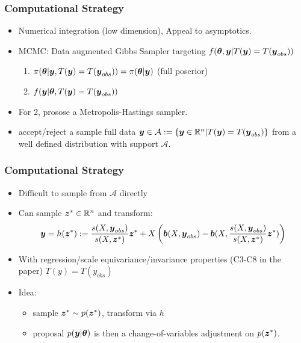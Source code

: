 \documentclass{beamer}
\def\bth{\mbox{\boldmath $\theta$}}
\newcommand{\by}{\mbox{\boldmath $y$}}
\newcommand{\bz}{\mbox{\boldmath $z$}}
\newcommand{\bb}{\mbox{\boldmath $b$}}
\begin{document}
\begin{frame}
\frametitle{Computational Strategy}
\begin{itemize}
	\item Numerical integration (low dimension), Appeal to asymptotics.
	\item MCMC: Data augmented Gibbs Sampler targeting $f(\bth, \by | T(\by)=T(\by_{obs}))$
	\begin{enumerate}
		\item $\pi(\bth|\by, T(\by)=T(\by_{obs})) = \pi(\bth | \by)$ (full poserior)
		\item $f(\by|\bth, T(\by)=T(\by_{obs}))$ 
	\end{enumerate}
\item For 2, prosose a Metropolis-Hastings sampler.
\item accept/reject a sample full data $\by \in \mathcal{A}:=\{\by \in \mathbb{R}^n | T(\by)=T(\by_{obs})\}$ from a well defined distribution with support  $\mathcal{A}$.
\end{itemize}
	
\end{frame}

\begin{frame}
	\frametitle{Computational Strategy}
	\begin{itemize}
		\item Difficult to sample from $ \mathcal{A}$ directly
		\item Can sample $\bz^{*} \in \mathbb{R}^{n}$ and transform:
		$$\by = h(\bz^*) := \frac{s(X,\by_{obs})}{s(X,\bz^*)} \bz^* + X\left(\bb(X,\by_{obs}) - \bb(X,\frac{s(X,\by_{obs})}{s(X,\bz^*)} \bz^*)\right) $$
		\item With regression/scale equivariance/invariance properties (C3-C8 in the paper) $T(y) = T(y_{obs})$
		\item Idea: 
		\begin{itemize}
		\item sample $\bz^{*}\sim p(\bz^*)$, transform via $h$
		\item proposal $p(\by|\bth)$ is then a change-of-variables adjustment on $p(\bz^*)$.
	\end{itemize}
	\end{itemize}	
\end{frame}
\end{document}
